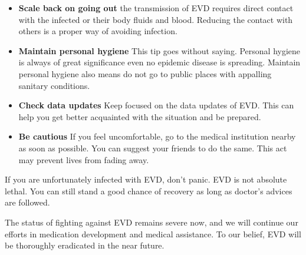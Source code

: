 \begin{itemize}
  \item \textbf{Scale back on going out}
  the transmission of EVD requires direct contact with the infected or their body fluids and blood. Reducing the contact with others is a proper way of avoiding infection.
  \item \textbf{Maintain personal hygiene}
  This tip goes without saying. Personal hygiene is always of great significance even no epidemic disease is spreading. Maintain personal hygiene also means do not go to public places with appalling sanitary conditions.
  \item \textbf{Check data updates}
  Keep focused on the data updates of EVD. This can help you get better acquainted with the situation and be prepared.
  \item \textbf{Be cautious}
  If you feel uncomfortable, go to the medical institution nearby as soon as possible. You can suggest your friends to do the same. This act may prevent lives from fading away.
\end{itemize}

If you are unfortunately infected with EVD, don't panic. EVD is not absolute lethal. You can still stand a good chance of recovery as long as doctor's advices are followed.

The status of fighting against EVD remains severe now, and we will continue our efforts in medication development and medical assistance. To our belief, EVD will be thoroughly eradicated in the near future. 